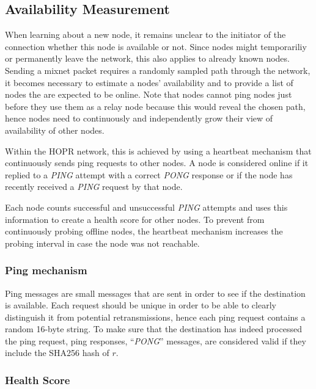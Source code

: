 \subsection{Availability Measurement}
\label{sec:p2p:availability}

When learning about a new node, it remains unclear to the initiator of the connection whether this node is available or not. Since nodes might temporariliy or permanently leave the network, this also applies to already known nodes. Sending a mixnet packet requires a randomly sampled path through the network, it becomes necessary to estimate a nodes' availability and to provide a list of nodes the are expected to be online. Note that nodes cannot ping nodes just before they use them as a relay node because this would reveal the chosen path, hence nodes need to continuously and independently grow their view of availability of other nodes.

Within the HOPR network, this is achieved by using a heartbeat mechanism that continuously sends ping requests to other nodes. A node is considered online if it replied to a \textit{PING} attempt with a correct \textit{PONG} response or if the node has recently received a \textit{PING} request by that node.

Each node counts successful and unsuccessful \textit{PING} attempts and uses this information to create a health score for other nodes. To prevent from continuously probing offline nodes, the heartbeat mechanism increases the probing interval in case the node was not reachable.

\subsubsection{Ping mechanism}
\label{sec:p2p:ping-mechanism}

Ping messages are small messages that are sent in order to see if the destination is available. Each request should be unique in order to be able to clearly distinguish it from potential retransmissions, hence each ping request contains a random 16-byte string. To make sure that the destination has indeed processed the ping request, ping responses, ``\textit{PONG}'' messages, are considered valid if they include the SHA256 hash of $r$.

\subsubsection{Health Score}
\label{sec:p2p:health-score}

